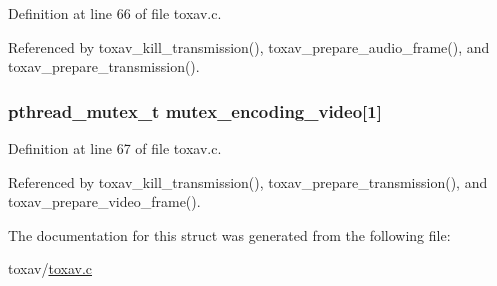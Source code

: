 Definition at line 66 of file toxav.\+c.



Referenced by toxav\+\_\+kill\+\_\+transmission(), toxav\+\_\+prepare\+\_\+audio\+\_\+frame(), and toxav\+\_\+prepare\+\_\+transmission().

\hypertarget{struct___tox_av_call_a89e9fe0c3fef08c502e53ad423dccc34}{
\subsubsection[{mutex\+\_\+encoding\+\_\+video}]{\setlength{\rightskip}{0pt plus 5cm}pthread\+\_\+mutex\+\_\+t mutex\+\_\+encoding\+\_\+video\mbox{[}1\mbox{]}}}\label{struct___tox_av_call_a89e9fe0c3fef08c502e53ad423dccc34}


Definition at line 67 of file toxav.\+c.



Referenced by toxav\+\_\+kill\+\_\+transmission(), toxav\+\_\+prepare\+\_\+transmission(), and toxav\+\_\+prepare\+\_\+video\+\_\+frame().



The documentation for this struct was generated from the following file\+:\begin{DoxyCompactItemize}
\item 
toxav/\hyperlink{toxav_8c}{toxav.\+c}\end{DoxyCompactItemize}
